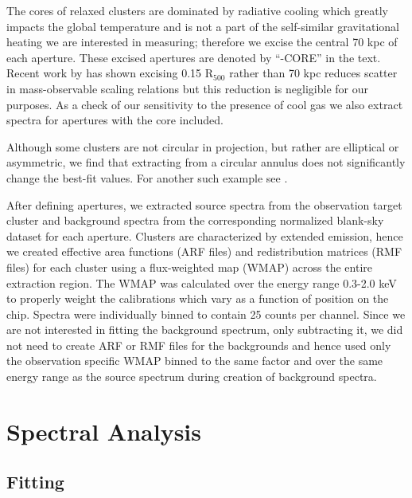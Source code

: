 \documentclass{emulateapj}
\begin{document}
The cores of relaxed clusters are dominated by radiative cooling which
greatly impacts the global temperature and is not a part of the self-similar
gravitational heating we are interested in measuring; therefore we
excise the central 70 kpc of each aperture. 
These excised apertures are denoted by ``-CORE'' in the text. Recent work by
\cite{2007astro.ph..3504M} has shown excising 0.15 R$_{500}$ rather
than 70 kpc reduces scatter in mass-observable scaling relations but
this reduction is negligible for our purposes. As a check of our
sensitivity to the presence of cool gas we also extract spectra for
apertures with the core included.

Although some clusters are not circular in projection, but rather are
elliptical or asymmetric, we find that extracting from a circular
annulus does not significantly change the best-fit values. For another
such example see \cite{2005MNRAS.359.1481B}.

After defining apertures, we extracted source spectra from the observation
target cluster and background spectra from the corresponding
normalized blank-sky dataset for each aperture. Clusters are
characterized by extended emission, hence we created effective area
functions (ARF files) and redistribution matrices (RMF files) for each cluster
using a flux-weighted map (WMAP) across the entire extraction region. The
WMAP was calculated over the energy range 0.3-2.0 keV to properly
weight the calibrations which vary as a function of position on the
chip. Spectra were individually binned to contain 25 counts per channel.
Since we are not interested in fitting the background spectrum, only
subtracting it, we did not need to create ARF
or RMF files for the backgrounds and hence used only the observation
specific WMAP binned to the same factor and over the
same energy range as the source spectrum during creation of background
spectra.

\section{Spectral Analysis} \label{sec:specan}

\subsection{Fitting} \label{sec:fitting}
\end{document}
